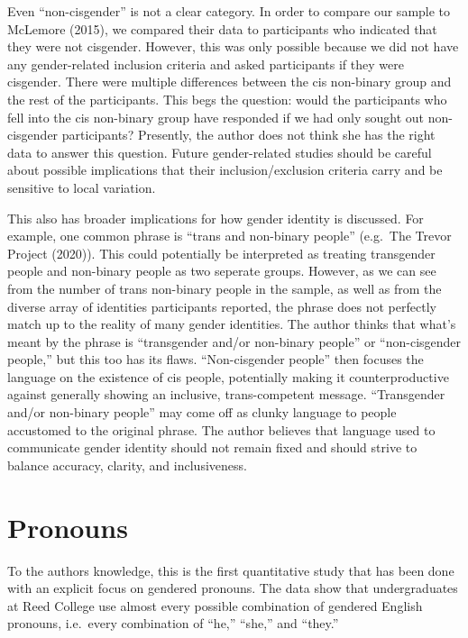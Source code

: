 \documentclass[12pt,twoside]{reedthesis}
\begin{document}
Even ``non-cisgender'' is not a clear category. In order to compare our sample to McLemore (2015), we compared their data to participants who indicated that they were not cisgender. However, this was only possible because we did not have any gender-related inclusion criteria and asked participants if they were cisgender. There were multiple differences between the cis non-binary group and the rest of the participants. This begs the question: would the participants who fell into the cis non-binary group have responded if we had only sought out non-cisgender participants? Presently, the author does not think she has the right data to answer this question. Future gender-related studies should be careful about possible implications that their inclusion/exclusion criteria carry and be sensitive to local variation.

This also has broader implications for how gender identity is discussed. For example, one common phrase is ``trans and non-binary people'' (e.g.~The Trevor Project (2020)). This could potentially be interpreted as treating transgender people and non-binary people as two seperate groups. However, as we can see from the number of trans non-binary people in the sample, as well as from the diverse array of identities participants reported, the phrase does not perfectly match up to the reality of many gender identities. The author thinks that what's meant by the phrase is ``transgender and/or non-binary people'' or ``non-cisgender people,'' but this too has its flaws. ``Non-cisgender people'' then focuses the language on the existence of cis people, potentially making it counterproductive against generally showing an inclusive, trans-competent message. ``Transgender and/or non-binary people'' may come off as clunky language to people accustomed to the original phrase. The author believes that language used to communicate gender identity should not remain fixed and should strive to balance accuracy, clarity, and inclusiveness.

\hypertarget{pronouns-2}{%
\section{Pronouns}\label{pronouns-2}}

To the authors knowledge, this is the first quantitative study that has been done with an explicit focus on gendered pronouns. The data show that undergraduates at Reed College use almost every possible combination of gendered English pronouns, i.e.~every combination of ``he,'' ``she,'' and ``they.''
\end{document}
